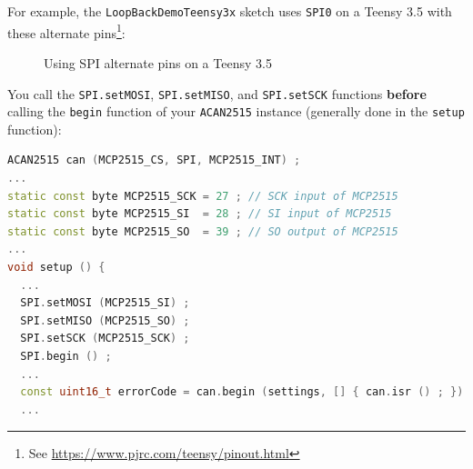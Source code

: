 \documentclass[9pt, a4paper, obeyspaces]{extarticle}
\newcommand\labelFigure[1]{\label{fig:#1}}
\begin{document}
For example, the \texttt{LoopBackDemoTeensy3x} sketch uses \texttt{SPI0} on a Teensy 3.5 with these alternate pins\footnote{See \url{https://www.pjrc.com/teensy/pinout.html}}:
\begin{figure}[!ht]
  \small
  \centering
  \caption{Using SPI alternate pins on a Teensy 3.5}
  \labelFigure{figureHardwareSPIAlternatePins}
\end{figure}

You call the \texttt{SPI.setMOSI}, \texttt{SPI.setMISO}, and \texttt{SPI.setSCK} functions \textbf{before} calling the \texttt{begin} function of your \texttt{ACAN2515} instance (generally done in the \texttt{setup} function):
{ \small\begin{lstlisting}[language=c++]
ACAN2515 can (MCP2515_CS, SPI, MCP2515_INT) ;
...
static const byte MCP2515_SCK = 27 ; // SCK input of MCP2515 
static const byte MCP2515_SI  = 28 ; // SI input of MCP2515  
static const byte MCP2515_SO  = 39 ; // SO output of MCP2515 
...
void setup () {
  ...
  SPI.setMOSI (MCP2515_SI) ;
  SPI.setMISO (MCP2515_SO) ;
  SPI.setSCK (MCP2515_SCK) ;
  SPI.begin () ;
  ...
  const uint16_t errorCode = can.begin (settings, [] { can.isr () ; }) ;
  ...
\end{lstlisting}}
\end{document}
